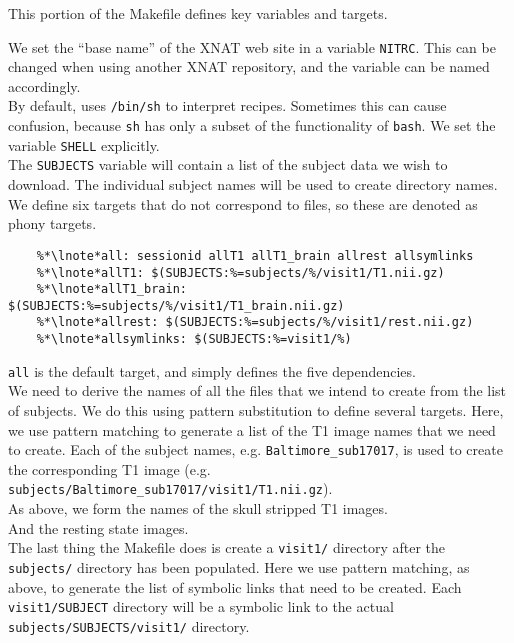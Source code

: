This portion of the Makefile defines key variables and targets. 

\indent {}We set the ``base name'' of the XNAT web site in a variable \texttt{NITRC}. This can be changed when using another XNAT repository, and the variable can be named accordingly. \\
\indent {} By default, \maken{} uses \texttt{/bin/sh} to interpret recipes. Sometimes this can cause confusion, because \texttt{sh} has only a subset of the functionality of \texttt{bash}. We set the \maken{} variable \texttt{SHELL} explicitly. \\
\indent {}The \texttt{SUBJECTS} variable will contain a list of the subject data we wish to download. The individual subject names will be used to create directory names. \\
\indent {}We define six targets that do not correspond to files, so these are denoted as phony targets.

\begin{lstlisting}
	%*\lnote*all: sessionid allT1 allT1_brain allrest allsymlinks
	%*\lnote*allT1: $(SUBJECTS:%=subjects/%/visit1/T1.nii.gz)
	%*\lnote*allT1_brain: $(SUBJECTS:%=subjects/%/visit1/T1_brain.nii.gz)
	%*\lnote*allrest: $(SUBJECTS:%=subjects/%/visit1/rest.nii.gz)
	%*\lnote*allsymlinks: $(SUBJECTS:%=visit1/%)
\end{lstlisting}

\indent {} \texttt{all} is the default target, and simply defines the five dependencies. \\
\indent {} We need to derive the names of all the files that we
intend to create from the list of subjects. We do this using pattern
substitution to define several targets. Here, we use pattern matching
to generate a list of the T1 image names that we need to create. Each of
the subject names, e.g. \texttt{Baltimore_sub17017}, is used to create
the corresponding T1 image (e.g. \texttt{subjects/Baltimore_sub17017/visit1/T1.nii.gz}).\\
\indent {} As above, we form the names of the skull stripped T1 images.\\
\indent {} And the resting state images.\\
\indent {} The last thing the Makefile does is create a
\texttt{visit1/} directory after the \texttt{subjects/} directory has
been populated. Here we use pattern matching, as above, to generate
the list of symbolic links that need to be created.  Each
\texttt{visit1/SUBJECT} directory will be a symbolic link to the actual \texttt{subjects/SUBJECTS/visit1/} directory.


